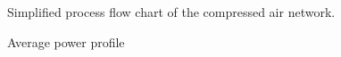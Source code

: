 \begin{figure}[h!]
	\centering
	\caption{Simplified process flow chart of the compressed air network.}
	\label{fig: Beatrix Air layout}
\end{figure}
\clearpage
\begin{figure}[h!]
	\centering
	
	\caption{Average power profile}
	\label{fig: Beatrix power baseline}
\end{figure}

